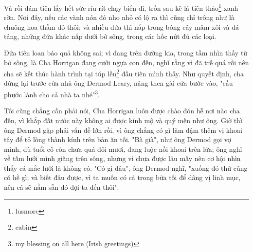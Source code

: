 Và rồi đám tiên lấy hết sức ríu rít chạy biến đi, trốn sau kẽ lá tiên thảo\footnote{lusmore} xanh rờn. Nơi đây, nếu các vành nón đỏ nho nhỏ có lộ ra thì cũng chỉ trông như là chuông hoa thẫm đỏ thôi; và nhiều đứa thì nấp trong bóng cây mâm xôi và đá tảng, những đứa khác nấp dưới bờ sông, trong các hốc nứt đủ các loại.

Đứa tiên loan báo quả không sai; vì đang trên đường kia, trong tầm nhìn thấy từ bờ sông, là Cha Horrigan đang cưỡi ngựa con đến, nghĩ rằng vì đã trễ quá rồi nên cha sẽ kết thúc hành trình tại túp lều\footnote{cabin} đầu tiên mình thấy. Như quyết định, cha dừng lại trước cửa nhà ông Dermod Leary, nâng then gài cửa bước vào, "cầu phước lành cho cả nhà ta nhé"\footnote{my blessing on all here (Irish greetings)}.

Tôi cũng chẳng cần phải nói, Cha Horrigan luôn được chào đón hễ nơi nào cha đến, vì khắp đất nước này không ai được kính mộ và quý mến như ông. Giờ thì ông Dermod gặp phải vấn đề lớn rồi, vì ông chẳng có gì làm đậm thêm vị khoai tây để tỏ lòng thành kính trên bàn ăn tối. "Bà già", như ông Dermod gọi vợ mình, dù tuổi cô còn chưa quá đôi mươi, đang luộc nồi khoai trên lửa; ông nghĩ về tấm lưới mình giăng trên sông, nhưng vì chưa được lâu mấy nên cơ hội nhìn thấy cá mắc lưới là không có. "Có gì đâu", ông Dermod nghĩ, "xuống đó thử cũng có hề gì; và biết đâu được, vì ta muốn có cá trong bữa tối để dâng vị linh mục, nên cá sẽ nằm sẵn đó đợi ta đến thôi".
